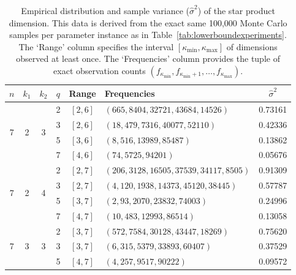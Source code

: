 \documentclass[a4paper,11pt,reqno]{article}
\theoremstyle{plain} \numberwithin{equation}{section}
\theoremstyle{definition}
\begin{document}
\begin{appendices}
\begin{table}[!ht]
 \footnotesize
\centering
\captionsetup{width=0.95\textwidth}
\caption{Empirical distribution and sample variance ($\hat{\sigma}^2$) of the star product dimension. This data is derived from the exact same 100,000 Monte Carlo samples per parameter instance as in Table~\ref{tab:lowerboundexperiments}. The `Range' column specifies the interval $[\kappa_{\min}, \kappa_{\max}]$ of dimensions observed at least once. The `Frequencies' column provides the tuple of exact observation counts $(f_{\kappa_{\min}}, f_{\kappa_{\min}+1}, \dots, f_{\kappa_{\max}})$.}
\label{tab:distribution_experiments}
\begin{tabular}{|c|c|c|c|c|l|c|}
\hline
$n$ & $k_1$ & $k_2$ & $q$ & Range & Frequencies & $\hat{\sigma}^2$ \\
\hline
\multirow{4}{*}{7}  & \multirow{4}{*}{2} & \multirow{4}{*}{3} 
                    & 2   & $[2, 6]$ & $(665, 8404, 32721, 43684, 14526)$ & 0.73161 \\
                    &                    &                    & 3   & $[2, 6]$ & $(18, 479, 7316, 40077, 52110)$ & 0.42336 \\
                    &                    &                    & 5   & $[3, 6]$ & $(8, 516, 13989, 85487)$ & 0.13862 \\
                    &                    &                    & 7   & $[4, 6]$ & $(74, 5725, 94201)$ & 0.05676 \\
\hline
\multirow{4}{*}{7}  & \multirow{4}{*}{2} & \multirow{4}{*}{4} 
                    & 2   & $[2, 7]$ & $(206, 3128, 16505, 37539, 34117, 8505)$ & 0.91309 \\
                    &                    &                    & 3   & $[2, 7]$ & $(4, 120, 1938, 14373, 45120, 38445)$ & 0.57787 \\
                    &                    &                    & 5   & $[3, 7]$ & $(2, 93, 2070, 23832, 74003)$ & 0.24996 \\
                    &                    &                    & 7   & $[4, 7]$ & $(10, 483, 12993, 86514)$ & 0.13058 \\
\hline
\multirow{4}{*}{7}  & \multirow{4}{*}{3} & \multirow{4}{*}{3} 
                    & 2   & $[3, 7]$ & $(572, 7584, 30128, 43447, 18269)$ & 0.75620 \\
                    &                    &                    & 3   & $[3, 7]$ & $(6, 315, 5379, 33893, 60407)$ & 0.37529 \\
                    &                    &                    & 5   & $[4, 7]$ & $(4, 257, 9517, 90222)$ & 0.09572 \\

\end{tabular}
\end{table}
\end{appendices}
\end{document}
